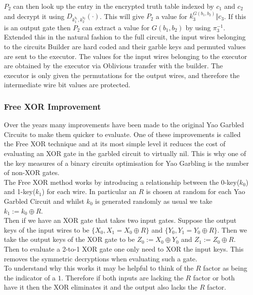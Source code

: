 \documentclass[ %
                    author={Nicholas Tutte},
                supervisor={Prof. Nigel Smart},
                    degree={MEng},
                     title={Secure Two Party Computation},
                  subtitle={A practical comparison of recent protocols},
                      type={Research - GG1K},
                      year={2015} ]{dissertation}
\begin{document}
			$P_2$ can then look up the entry in the encrypted truth table indexed by $c_1$ and $c_2$ and decrypt it using $D_{k_1^{b_1}, k_2^{b_2}}(\cdot)$. This will give $P_2$ a value for $k_3^{G(b_1, b_2)} \Vert c_3$. If this is an output gate then $P_2$ can extract a value for $G(b_1, b_2)$ by using $\pi_3^{-1}$.\\

			Extended this in the natural fashion to the full circuit, the input wires belonging to the circuits Builder are hard coded and their garble keys and permuted values are sent to the executor. The values for the input wires belonging to the executor are obtained by the executor via Oblivious transfer with the builder. The executor is only given the permutations for the output wires, and therefore the intermediate wire bit values are protected.

			\subsubsection{Free XOR Improvement}

				Over the years many improvements have been made to the original Yao Garbled Circuits to make them quicker to evaluate. One of these improvements is called the Free XOR technique and at its most simple level it reduces the cost of evaluating an XOR gate in the garbled circuit to virtually nil. This is why one of the key measures of a binary circuits optimisation for Yao Garbling is the number of non-XOR gates.\\

				The Free XOR method works by introducing a relationship between the 0-key($k_0$) and 1-key($k_1$) for each wire. In particular an $R$ is chosen at random for each Yao Garbled Circuit and whilst $k_0$ is generated randomly as usual we take $k_1 := k_0 \oplus R$.\\

				Then if we have an XOR gate that takes two input gates. Suppose the output keys of the input wires to be $\{X_0, X_1 = X_0 \oplus R\}$ and $\{Y_0, Y_1 = Y_0 \oplus R\}$. Then we take the output keys of the XOR gate to be $Z_0 := X_0 \oplus Y_0$ and $Z_1 := Z_0 \oplus R$.\\

				Then to evaluate a 2-to-1 XOR gate one only need to XOR the input keys. This removes the symmetric decryptions when evaluating such a gate.\\

				To understand why this works it may be helpful to think of the $R$ factor as being the indicator of a $1$. Therefore if both inputs are lacking the $R$ factor or both have it then the XOR eliminates it and the output also lacks the $R$ factor.\\
\end{document}
